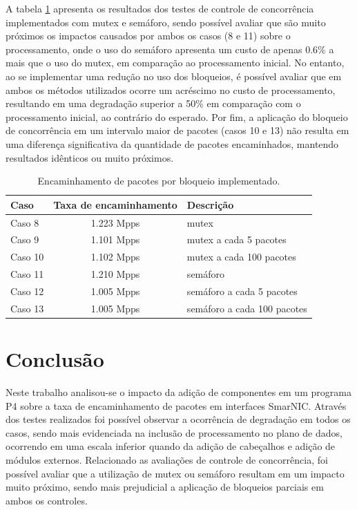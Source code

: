 \documentclass[12pt]{article}
\begin{document}
A tabela \ref{tab:bloqueios} apresenta os resultados dos testes de controle de concorrência implementados com mutex e semáforo, sendo possível avaliar que são muito próximos os impactos causados por ambos os casos (8 e 11) sobre o processamento, onde o uso do semáforo apresenta um custo de apenas 0.6\% a mais que o uso do mutex, em comparação ao processamento inicial. No entanto, ao se implementar uma redução no uso dos bloqueios, é possível avaliar que em ambos os métodos utilizados ocorre um acréscimo no custo de processamento, resultando em uma degradação superior a 50\% em comparação com o processamento inicial, ao contrário do esperado. Por fim, a aplicação do bloqueio de concorrência em um intervalo maior de pacotes (casos 10 e 13) não resulta em uma diferença significativa da quantidade de pacotes encaminhados, mantendo resultados idênticos ou muito próximos. 

\begin{table}[!htb]
    \centering
    \caption{Encaminhamento de pacotes por bloqueio implementado.}
    \label{tab:bloqueios}
    \begin{tabular}{| l | c | l |} \hline
        Caso    &Taxa de encaminhamento & Descrição\\ \hline
        Caso 8  &1.223 Mpps & mutex\\ \hline
        Caso 9  &1.101 Mpps & mutex a cada 5 pacotes\\ \hline
        Caso 10  &1.102 Mpps & mutex a cada 100 pacotes\\ \hline
        Caso 11  &1.210 Mpps & semáforo \\ \hline
        Caso 12  &1.005 Mpps & semáforo a cada 5 pacotes\\ \hline
        Caso 13  &1.005 Mpps & semáforo a cada 100 pacotes\\ \hline
    \end{tabular}
\end{table}


\section{Conclusão} \label{sec:conclusoes}

Neste trabalho analisou-se o impacto da adição de componentes em um programa P4 sobre a taxa de encaminhamento de pacotes em interfaces SmarNIC. Através dos testes realizados foi possível observar a ocorrência de degradação em todos os casos, sendo mais evidenciada na inclusão de processamento no plano de dados, ocorrendo em uma escala inferior quando da adição de cabeçalhos e adição de módulos externos.  
Relacionado as avaliações de controle de concorrência, foi possível avaliar que a utilização de mutex ou semáforo resultam em um impacto muito próximo, sendo mais prejudicial a aplicação de bloqueios parciais em ambos os controles.
\end{document}
